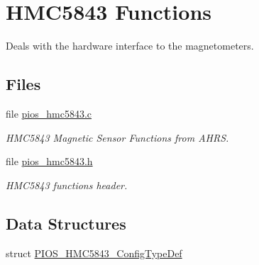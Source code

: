 \hypertarget{group___p_i_o_s___h_m_c5843}{\section{H\-M\-C5843 Functions}
\label{group___p_i_o_s___h_m_c5843}
}


Deals with the hardware interface to the magnetometers.  


\subsection*{Files}
\begin{DoxyCompactItemize}
\item 
file \hyperlink{pios__hmc5843_8c}{pios\-\_\-hmc5843.\-c}
\begin{DoxyCompactList}\small\item\em H\-M\-C5843 Magnetic Sensor Functions from A\-H\-R\-S. \end{DoxyCompactList}\item 
file \hyperlink{pios__hmc5843_8h}{pios\-\_\-hmc5843.\-h}
\begin{DoxyCompactList}\small\item\em H\-M\-C5843 functions header. \end{DoxyCompactList}\end{DoxyCompactItemize}
\subsection*{Data Structures}
\begin{DoxyCompactItemize}
\item 
struct \hyperlink{struct_p_i_o_s___h_m_c5843___config_type_def}{P\-I\-O\-S\-\_\-\-H\-M\-C5843\-\_\-\-Config\-Type\-Def}
\end{DoxyCompactItemize}
